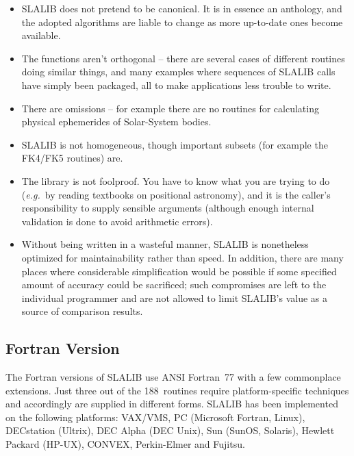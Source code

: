 \documentclass[11pt,twoside]{article}
\newcommand{\nroutines} {188}
\begin{document}
\begin{itemize}
\item SLALIB does not pretend to be canonical.  It is in essence
an anthology, and the adopted algorithms are liable
to change as more up-to-date ones become available.
\item The functions aren't orthogonal -- there are several
cases of different
routines doing similar things, and many examples where
sequences of SLALIB calls have simply been packaged, all to
make applications less trouble to write.
\item There are omissions -- for example there are no
routines for calculating physical ephemerides of
Solar-System bodies.
\item SLALIB is not homogeneous, though important subsets
(for example the FK4/FK5 routines) are.
\item The library is not foolproof.  You have to know what
you are trying to do ({\it e.g.}\ by reading textbooks on positional
astronomy), and it is the caller's responsibility to supply
sensible arguments (although enough internal validation is done to
avoid arithmetic errors).
\item Without being written in a wasteful
manner, SLALIB is nonetheless optimized for maintainability
rather than speed.  In addition, there are many places
where considerable simplification would be possible if some
specified amount of accuracy could be sacrificed;  such
compromises are left to the individual programmer and
are not allowed to limit SLALIB's value as a source
of comparison results.
\end{itemize}

\subsection{Fortran Version}
The Fortran versions of SLALIB use ANSI Fortran~77 with a few
commonplace extensions.  Just three out of the \nroutines\ routines require
platform-specific techniques and accordingly are supplied
in different forms.
SLALIB has been implemented on the following platforms:
VAX/VMS,
PC (Microsoft Fortran, Linux),
DECstation (Ultrix),
DEC Alpha (DEC Unix),
Sun (SunOS, Solaris),
Hewlett Packard (HP-UX),
CONVEX,
Perkin-Elmer and
Fujitsu.
\end{document}
